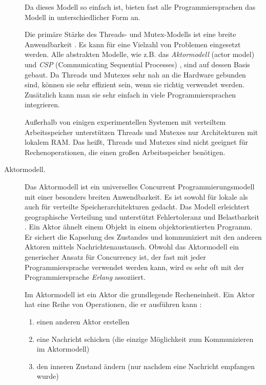 \begin{description}
	Da dieses Modell so einfach ist, bieten fast alle Programmiersprachen das Modell in unterschiedlicher Form an.
	
	Die primäre Stärke des Threads- und Mutex-Modells ist eine breite Anwendbarkeit \cite{Long10javaconcurrency}. Es kann für eine Vielzahl von Problemen eingesetzt werden. Alle abstrakten Modelle, wie z.B. das \textit{Aktormodell} \cite{Hewitt_artificialintelligence} (actor model) und \textit{CSP} (Communicating Sequential Processes) \cite{Graham_communicatingsequential}, sind auf dessen Basis gebaut. Da Threads und Mutexes sehr nah an die Hardware gebunden sind, können sie sehr effizient sein, wenn sie richtig verwendet werden. Zusätzlich kann man sie sehr einfach in viele Programmiersprachen integrieren.
	
	Außerhalb von einigen experimentellen Systemen mit verteiltem Arbeitsspeicher unterstützen Threads und Mutexes nur Architekturen mit lokalem RAM. Das heißt, Threads und Mutexes sind nicht geeignet für Rechenoperationen, die einen großen Arbeitsspeicher benötigen.
	
	\item[Aktormodell.] Das Aktormodell ist ein universelles Concurrent Programmierungsmodell mit einer besonders breiten Anwendbarkeit. Es ist sowohl für lokale als auch für verteilte Speicherarchitekturen gedacht. Das Modell erleichtert geographische Verteilung und unterstützt Fehlertoleranz und Belastbarkeit \cite{Hewitt_artificialintelligence}.
	Ein Aktor ähnelt einem Objekt in einem objektorientierten Programm. Er sichert die Kapselung des Zustandes und kommuniziert mit den anderen Aktoren mittels Nachrichtenaustausch. Obwohl das Aktormodell ein generischer Ansatz für Concurrency ist, der fast mit jeder Programmiersprache verwendet werden kann, wird es sehr oft mit der Programmiersprache \textit{Erlang} assoziiert.
	
	Im Aktormodell ist ein Aktor die grundlegende Recheneinheit. Ein Aktor hat eine Reihe von Operationen, die er ausführen kann \cite{Hewitt_artificialintelligence}:
	
	\begin{enumerate}
		\item einen anderen Aktor erstellen
		
		\item eine Nachricht schicken (die einzige Möglichkeit zum Kommunizieren im Aktormodell)
		
		\item den inneren Zustand ändern (nur nachdem eine Nachricht empfangen wurde)
	\end{enumerate}


\end{description}

